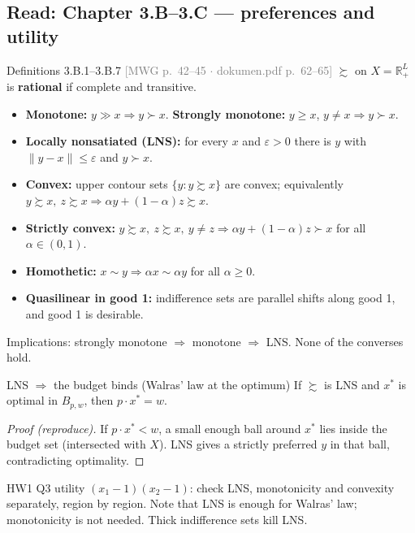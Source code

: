 \documentclass[11pt]{article}
\newcommand{\R}{\mathbb{R}}
\newcommand{\pref}{\succsim}
\newcommand{\spref}{\succ}
\newcommand{\ind}{\sim}
\newcommand{\mwg}[2]{\hfill{\small\textcolor{gray}{[MWG p.~#1 $\cdot$ dokumen.pdf p.~#2]}}}
\begin{document}
\subsection{Read: Chapter 3.B--3.C --- preferences and utility}\label{sec:prefs}

\begin{defn}{Definitions 3.B.1--3.B.7 \mwg{42--45}{62--65}}
$\pref$ on $X=\R^L_+$ is \textbf{rational} if complete and transitive.
\begin{itemize}
\item \textbf{Monotone:} $y\gg x\Rightarrow y\spref x$. \quad \textbf{Strongly monotone:} $y\ge x$, $y\ne x\Rightarrow y\spref x$.
\item \textbf{Locally nonsatiated (LNS):} for every $x$ and $\varepsilon>0$ there is $y$ with $\|y-x\|\le\varepsilon$ and $y\spref x$.
\item \textbf{Convex:} upper contour sets $\{y:y\pref x\}$ are convex; equivalently $y\pref x,\ z\pref x\Rightarrow \alpha y+(1-\alpha)z\pref x$.
\item \textbf{Strictly convex:} $y\pref x,\ z\pref x,\ y\ne z\Rightarrow \alpha y+(1-\alpha)z\spref x$ for all $\alpha\in(0,1)$.
\item \textbf{Homothetic:} $x\ind y\Rightarrow \alpha x\ind\alpha y$ for all $\alpha\ge0$.
\item \textbf{Quasilinear in good 1:} indifference sets are parallel shifts along good 1, and good 1 is desirable.
\end{itemize}
Implications: strongly monotone $\Rightarrow$ monotone $\Rightarrow$ LNS. None of the converses hold.
\end{defn}

\begin{prop}{LNS $\Rightarrow$ the budget binds (Walras' law at the optimum)}
If $\pref$ is LNS and $x^*$ is optimal in $B_{p,w}$, then $p\cdot x^*=w$.
\end{prop}
\begin{proof}[Proof (reproduce)]
If $p\cdot x^*<w$, a small enough ball around $x^*$ lies inside the budget set (intersected with $X$). LNS gives a strictly preferred $y$ in that ball, contradicting optimality.
\end{proof}

\begin{exam}
HW1 Q3 utility $(x_1-1)(x_2-1)$: check LNS, monotonicity and convexity separately, region by region. Note that LNS is enough for Walras' law; monotonicity is not needed. Thick indifference sets kill LNS.
\end{exam}
\end{document}
